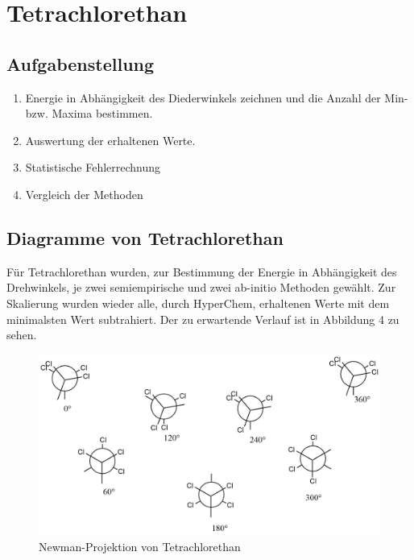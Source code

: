 \section{Tetrachlorethan}

\subsection{Aufgabenstellung}

\begin{enumerate}
    \item Energie in Abhängigkeit des Diederwinkels zeichnen und die Anzahl der Min- bzw. Maxima bestimmen.
    \item Auswertung der erhaltenen Werte.
    \item Statistische Fehlerrechnung
    \item Vergleich der Methoden 
\end{enumerate}

\subsection{Diagramme von Tetrachlorethan}

Für Tetrachlorethan wurden, zur Bestimmung der Energie in Abhängigkeit des Drehwinkels, je zwei semiempirische und zwei ab-initio Methoden gewählt.
Zur Skalierung wurden wieder alle, durch HyperChem, erhaltenen Werte mit dem minimalsten Wert subtrahiert. Der zu erwartende Verlauf ist in Abbildung 4 zu sehen.
\vspace{1cm}

\begin{figure}[H]
    \centering
    \includegraphics[scale=.3]{../src/img/newmanTetrachlorethan.png}
    \caption{Newman-Projektion von Tetrachlorethan}
\end{figure}

